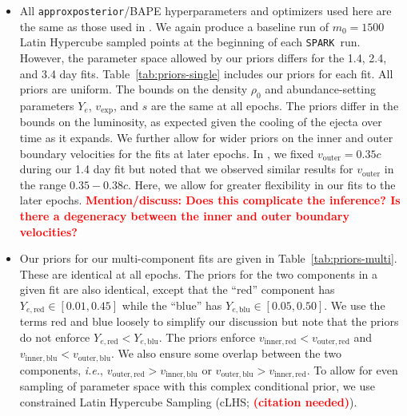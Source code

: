 \documentclass[twocolumn, twocolappendix]{aastex63}
\def\SPARK{\texttt{SPARK}}
\def\citneeded{\textcolor{red}{\textbf{(citation needed)}}}
\newcommand\redbf[1]{\textbf{\textcolor{red}{#1}}}
\def\ie{{\it i.e.}}
\begin{document}
\begin{itemize}

    \item All \texttt{approxposterior}/BAPE hyperparameters and optimizers used here are the same as those used in \cite{vieira23}. We again produce a baseline run of $m_{0} = 1500$ Latin Hypercube sampled points at the beginning of each \SPARK~run. However, the parameter space allowed by our priors differs for the 1.4, 2.4, and 3.4 day fits. Table~\ref{tab:priors-single} includes our priors for each fit. All priors are uniform. The bounds on the density $\rho_0$ and abundance-setting parameters $Y_e$, $v_{\mathrm{exp}}$, and $s$ are the same at all epochs. The priors differ in the bounds on the luminosity, as expected given the cooling of the ejecta over time as it expands. We further allow for wider priors on the inner and outer boundary velocities for the fits at later epochs. In \cite{vieira23}, we fixed $v_{\mathrm{outer}} = 0.35c$ during our 1.4 day fit but noted that we observed similar results for $v_{\mathrm{outer}}$ in the range $0.35 - 0.38c$. Here, we allow for greater flexibility in our fits to the later epochs. \redbf{Mention/discuss: Does this complicate the inference? Is there a degeneracy between the inner and outer boundary velocities?}
    
    \item Our priors for our multi-component fits are given in Table~\ref{tab:priors-multi}. These are identical at all epochs. The priors for the two components in a given fit are also identical, except that the ``red'' component has $Y_{e,\mathrm{red}} \in [0.01, 0.45]$ while the ``blue'' has $Y_{e,\mathrm{blu}} \in [0.05, 0.50]$. We use the terms red and blue loosely to simplify our discussion but note that the priors do not enforce $Y_{e,\mathrm{red}} < Y_{e,\mathrm{blu}}$. The priors enforce $v_{\mathrm{inner,red}} < v_{\mathrm{outer,red}}$ and $v_{\mathrm{inner,blu}} < v_{\mathrm{outer,blu}}$. We also ensure some overlap between the two components, \ie, $v_{\mathrm{outer,red}} > v_{\mathrm{inner,blu}}$ or $v_{\mathrm{outer,blu}} > v_{\mathrm{inner,red}}$. To allow for even sampling of parameter space with this complex conditional prior, we use constrained Latin Hypercube Sampling (cLHS; \citneeded ).
    

\end{itemize}
\end{document}
